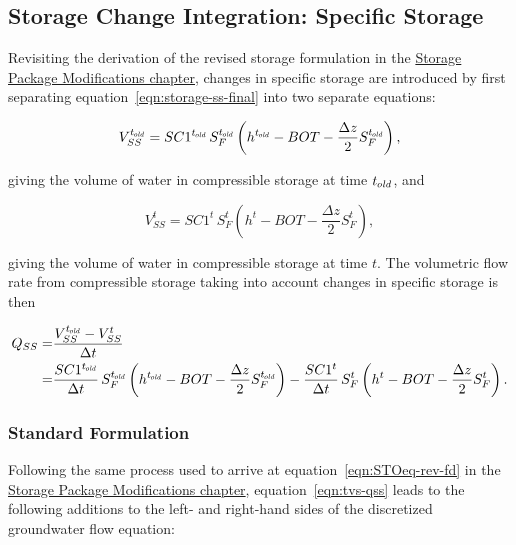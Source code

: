 \subsection{Storage Change Integration: Specific Storage} \label{sec:sci-ss}

Revisiting the derivation of the revised storage formulation in the \hyperref[ch:sto-mod]{Storage Package Modifications chapter}, changes in specific storage are introduced by first separating equation~\ref{eqn:storage-ss-final} into two separate equations:

\begin{equation}
	\label{eqn:tvs-vss-old}
	V_{SS}^{t_\mathit{\kern -0.07em old}} = SC1^{t_\mathit{\kern -0.07em old}} \, S_F^{t_\mathit{\kern -0.07em old}} \left( h^{t_\mathit{\kern -0.07em old}} - BOT - \frac{\Delta z}{2} S_F^{t_\mathit{\kern -0.07em old}} \right) ,
\end{equation}

\noindent giving the volume of water in compressible storage at time ${t_\mathit{\kern -0.07em old}}$, and

\begin{equation}
	\label{eqn:tvs-vss-new}
	V_{SS}^t = SC1^t \, S_F^t \left( h^t - BOT - \frac{\Delta z}{2} S_F^t \right) ,
\end{equation}

\noindent giving the volume of water in compressible storage at time $t$. The volumetric flow rate from compressible storage taking into account changes in specific storage is then

\begin{equation}
	\label{eqn:tvs-qss}
	\begin{aligned}
	Q_{SS} = & \frac{V_{SS}^{t_\mathit{\kern -0.07em old}} - V_{SS}^t}{\Delta t} \\
	       = & \frac{SC1^{t_\mathit{\kern -0.07em old}}}{\Delta t} \, S_F^{t_\mathit{\kern -0.07em old}} \left( h^{t_\mathit{\kern -0.07em old}} - BOT - \frac{\Delta z}{2} S_F^{t_\mathit{\kern -0.07em old}} \right) - \frac{SC1^t}{\Delta t} \, S_F^t \left( h^t - BOT - \frac{\Delta z}{2} S_F^t \right) .
	\end{aligned}
\end{equation}


\subsubsection{Standard Formulation}

Following the same process used to arrive at equation~\ref{eqn:STOeq-rev-fd} in the \hyperref[ch:sto-mod]{Storage Package Modifications chapter}, equation~\ref{eqn:tvs-qss} leads to the following additions to the left- and right-hand sides of the discretized groundwater flow equation:

